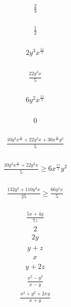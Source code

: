 \documentclass{article}
\begin{document}
\begin{align*}
\frac{2}{3}\end{align*}
\\
\begin{align*}
\frac{1}{2}\end{align*}
\\
\begin{align*}
2y_{}^{3}x_{}^{\frac{11}{5}}\end{align*}
\\
\begin{align*}
\frac{22y_{}^{3}x_{}}{5}\end{align*}
\\
\begin{align*}
6y_{}^{2}x_{}^{\frac{11}{5}}\end{align*}
\\
\begin{align*}
0\end{align*}
\\
\begin{align*}
\frac{10y_{}^{3}x_{}^{\frac{11}{5}} + 22y_{}^{3}x_{} + 30x_{}^{\frac{11}{5}}y_{}^{2}}{5}\end{align*}
\\
\begin{align*}
\frac{10y_{}^{3}x_{}^{\frac{11}{5}} + 22y_{}^{3}x_{}}{5} \ge 6x_{}^{\frac{11}{5}}y_{}^{2}\end{align*}
\\
\begin{align*}
\frac{132y_{}^{3} + 110y_{}^{3}x_{}}{25} \ge \frac{66y_{}^{2}x_{}}{5}\end{align*}
\\
\begin{align*}
\frac{5x_{} + 4y_{}}{7z_{}}\end{align*}
\begin{align*}
2\end{align*}
\begin{align*}
2y_{}\end{align*}
\begin{align*}
y_{} + z_{}\end{align*}
\begin{align*}
x_{}\end{align*}
\begin{align*}
y_{} + 2z_{}\end{align*}
\begin{align*}
\frac{x_{}^{2} - y_{}^{2}}{x_{} - y_{}}\end{align*}
\begin{align*}
\frac{x_{}^{2} + y_{}^{2} + 2x_{}y_{}}{x_{} + y_{}}\end{align*}
\end{document}
